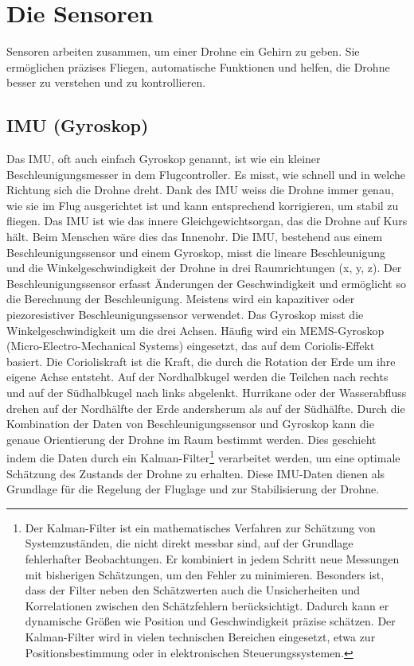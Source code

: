 \chapter{Die Sensoren}\label{sec:Sensoren}

Sensoren arbeiten zusammen, um einer Drohne ein Gehirn zu geben. Sie ermöglichen präzises Fliegen, automatische Funktionen und helfen, die Drohne besser zu verstehen und zu kontrollieren.

  \section{IMU (Gyroskop) }  
Das IMU, oft auch einfach Gyroskop genannt, ist wie ein kleiner Beschleunigungsmesser in dem Flugcontroller. Es misst, wie schnell und in welche Richtung sich die Drohne dreht.
Dank des IMU weiss die Drohne immer genau, wie sie im Flug ausgerichtet ist und kann entsprechend korrigieren, um stabil zu fliegen. Das IMU ist wie das innere Gleichgewichtsorgan, das die Drohne auf Kurs hält. Beim Menschen wäre dies das Innenohr.
Die IMU, bestehend aus einem Beschleunigungssensor und einem Gyroskop, misst die lineare Beschleunigung und die Winkelgeschwindigkeit der Drohne in drei Raumrichtungen (x, y, z). Der Beschleunigungssensor erfasst Änderungen der Geschwindigkeit und ermöglicht so die Berechnung der Beschleunigung. Meistens wird ein kapazitiver oder piezoresistiver Beschleunigungssensor verwendet. Das Gyroskop misst die Winkelgeschwindigkeit um die drei Achsen. Häufig wird ein MEMS-Gyroskop (Micro-Electro-Mechanical Systems) eingesetzt, das auf dem Coriolis-Effekt basiert. Die Corioliskraft ist die Kraft, die durch die Rotation der Erde um ihre eigene Achse entsteht. Auf der Nordhalbkugel werden die Teilchen nach rechts und auf der Südhalbkugel nach links abgelenkt. Hurrikane oder der Wasserabfluss drehen auf der Nordhälfte der Erde andersherum als auf der Südhälfte\cite{Coriolis}. Durch die Kombination der Daten von Beschleunigungssensor und Gyroskop kann die genaue Orientierung der Drohne im Raum bestimmt werden. Dies geschieht  indem die Daten durch ein Kalman-Filter\footnote{Der Kalman-Filter ist ein mathematisches Verfahren zur Schätzung von Systemzuständen, die nicht direkt messbar sind, auf der Grundlage fehlerhafter Beobachtungen. Er kombiniert in jedem Schritt neue Messungen mit bisherigen Schätzungen, um den Fehler zu minimieren. Besonders ist, dass der Filter neben den Schätzwerten auch die Unsicherheiten und Korrelationen zwischen den Schätzfehlern berücksichtigt. Dadurch kann er dynamische Größen wie Position und Geschwindigkeit präzise schätzen. Der Kalman-Filter wird in vielen technischen Bereichen eingesetzt, etwa zur Positionsbestimmung oder in elektronischen Steuerungssystemen.\cite{Kalman}} verarbeitet werden, um eine optimale Schätzung des Zustands der Drohne zu erhalten. Diese IMU-Daten dienen als Grundlage für die Regelung der Fluglage und zur Stabilisierung der Drohne.





